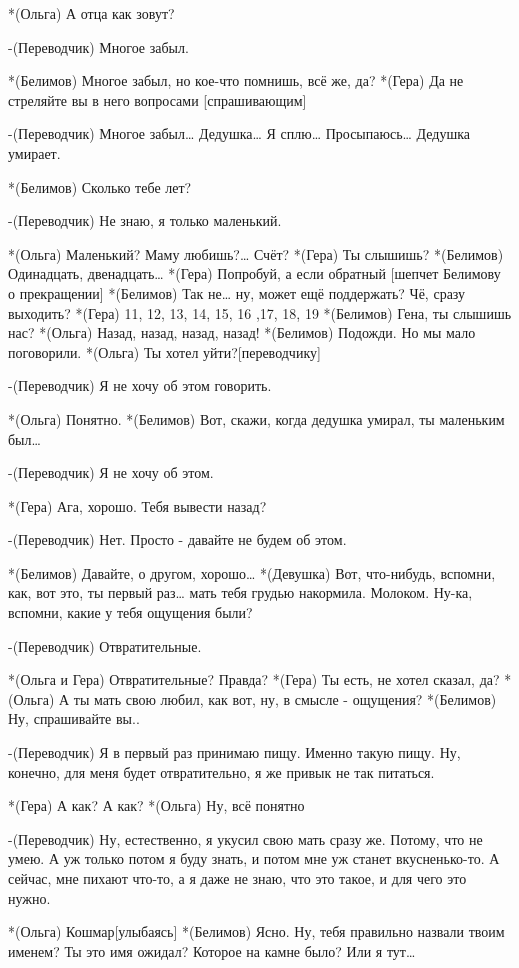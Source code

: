 *(Ольга) А отца как зовут?

-(Переводчик) Многое забыл.

*(Белимов) Многое забыл, но кое-что помнишь, всё же, да?
*(Гера) Да не стреляйте вы  в него вопросами [спрашивающим]

-(Переводчик) Многое забыл…  Дедушка… Я сплю… Просыпаюсь… Дедушка умирает.

*(Белимов) Сколько тебе лет?

-(Переводчик) Не знаю, я только маленький.

*(Ольга) Маленький? Маму любишь?… Счёт?
*(Гера) Ты слышишь?
*(Белимов) Одинадцать, двенадцать…
*(Гера) Попробуй, а если обратный [шепчет Белимову о прекращении]
*(Белимов) Так не… ну, может ещё поддержать? Чё, сразу выходить?
*(Гера) 11, 12, 13, 14, 15, 16 ,17, 18, 19
*(Белимов) Гена, ты слышишь нас?
*(Ольга) Назад, назад, назад, назад!
*(Белимов) Подожди. Но мы мало поговорили.
*(Ольга) Ты хотел уйти?[переводчику]

-(Переводчик) Я не хочу об этом говорить.

*(Ольга) Понятно.
*(Белимов) Вот, скажи, когда дедушка умирал, ты маленьким был…

-(Переводчик) Я не хочу об этом.

*(Гера) Ага, хорошо. Тебя вывести назад?

-(Переводчик) Нет. Просто - давайте не будем об этом.

*(Белимов) Давайте, о другом, хорошо…
*(Девушка) Вот, что-нибудь, вспомни, как, вот это, ты первый раз… мать тебя грудью накормила. Молоком. Ну-ка, вспомни, какие у тебя ощущения были?

-(Переводчик) Отвратительные.

*(Ольга и Гера) Отвратительные? Правда?
*(Гера) Ты есть, не хотел сказал, да?
*(Ольга) А ты мать свою любил, как вот, ну, в смысле - ощущения?
*(Белимов) Ну, спрашивайте вы..

-(Переводчик) Я в первый раз принимаю пищу. Именно такую пищу. Ну, конечно, для меня будет отвратительно, я же привык не так питаться.

*(Гера) А как? А как?
*(Ольга) Ну, всё понятно

-(Переводчик) Ну, естественно, я укусил свою мать сразу же. Потому, что не умею. А уж только потом я буду знать, и потом мне уж станет вкусненько-то. А сейчас, мне пихают что-то, а я даже не знаю, что это такое, и для чего это нужно.

*(Ольга) Кошмар[улыбаясь]
*(Белимов) Ясно. Ну, тебя правильно назвали твоим именем? Ты это имя ожидал? Которое на камне было? Или я тут…

